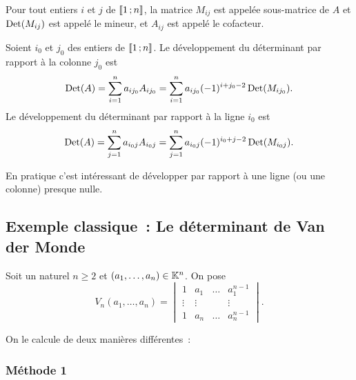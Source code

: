 \begin{defdef}
  Pour tout entiers \(i\) et \(j\) de \(\mathopen{\llbracket}1\mathclose{}\mathpunct{};n\mathclose{\rrbracket}\), la 
  matrice \(M_{ij}\) est appelée sous-matrice de \(A\) et \(\operatorname{Det}(M_{ij})\) 
  est appelé le mineur, et \(A_{ij}\) est appelé le cofacteur.
\end{defdef}
%
\begin{theo}
  Soient \(i_0\) et \(j_0\) des entiers de \(\mathopen{\llbracket}1\mathclose{}\mathpunct{};n\mathclose{\rrbracket}\). Le 
  développement du déterminant par rapport à la colonne \(j_0\) est
  \begin{equation}
    \operatorname{Det}(A) = \sum_{i=1}^n a_{ij_0}A_{ij_0} = \sum_{i=1}^n 
    a_{ij_0}(-1)^{i+j_0-2} \operatorname{Det}(M_{ij_0}).
  \end{equation}
  Le développement du déterminant par rapport à la ligne \(i_0\) est
  \begin{equation}
    \operatorname{Det}(A) = \sum_{j=1}^n a_{i_0j}A_{i_0j} = \sum_{j=1}^n 
    a_{i_0j}(-1)^{i_0+j-2} \operatorname{Det}(M_{i_0j}).
  \end{equation}

  En pratique c'est intéressant de développer par rapport à une ligne (ou 
  une colonne) presque nulle.
\end{theo}

\subsection{Exemple classique~: Le déterminant de Van der Monde}

Soit un naturel \(n \geqslant 2\) et \((a_1, \ldots, a_n) \in \mathbb{K}^n\). On 
pose
\begin{equation}
  V_n(a_1, \ldots, a_n) =
  \begin{vmatrix}
    1 & a_1 & \ldots & a_1^{n-1} \\
    \vdots & \vdots &  & \vdots \\
    1 & a_n & \ldots & a_n^{n-1}
  \end{vmatrix}.
\end{equation}

On le calcule de deux manières différentes~:

\subsubsection{Méthode 1}

